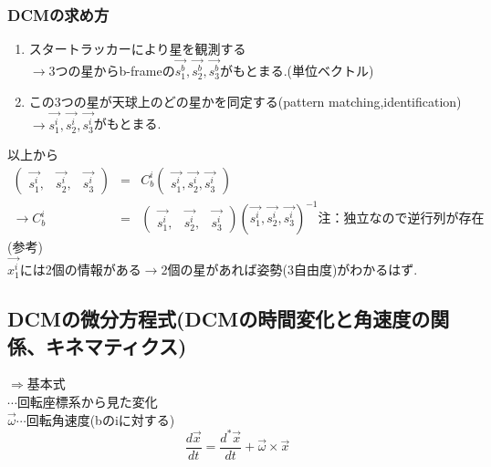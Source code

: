 \documentclass[class=article, crop=false, preview=false, dvipdfmx, a4paper]{standalone}
\begin{document}
\subsubsection{DCMの求め方}
\begin{enumerate}
\item スタートラッカーにより星を観測する\\
$\rightarrow$3つの星からb-frameの$\vec{s^b_1},\vec{s^b_2},\vec{s^b_3}$がもとまる.(単位ベクトル)
\item この3つの星が天球上のどの星かを同定する(pattern matching,identification)\\
$\rightarrow\vec{s^i_1},\vec{s^i_2},\vec{s^i_3}$がもとまる.
\end{enumerate}
以上から
\begin{align*}
\begin{pmatrix}
	\vec{s^i_1}, & \vec{s^i_2}, & \vec{s^i_3}
\end{pmatrix}
& = &
C^i_b
\begin{pmatrix}
	\vec{s^i_1},\vec{s^i_2},\vec{s^i_3}
\end{pmatrix}
\\
\rightarrow 
C^i_b & = &
\begin{pmatrix}
\vec{s^i_1}, & \vec{s^i_2}, & \vec{s^i_3}
\end{pmatrix}
\left( \vec{s^i_1},\vec{s^i_2},\vec{s^i_3} \right)^{-1}\mbox{注：独立なので逆行列が存在}
\end{align*}
(参考)\\
$\vec{x^i_1}$には2個の情報がある$\rightarrow$2個の星があれば姿勢(3自由度)がわかるはず.


\subsection{DCMの微分方程式(DCMの時間変化と角速度の関係、キネマティクス)}
$\Rightarrow$基本式\\
\text{*}$\cdots$回転座標系から見た変化\\
$\vec{\omega}\cdots$回転角速度(bのiに対する)
\[ \frac{d\vec{x}}{dt}=\frac{d^*\vec{x}}{dt}+\vec{\omega}\times\vec{x} \]
\end{document}
